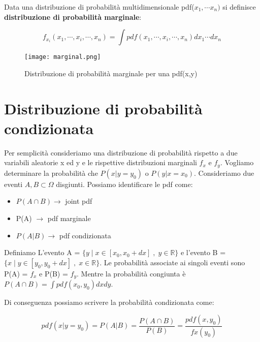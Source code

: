 Data una distribuzione di probabilit\`{a} multidimensionale pdf($x_1,\cdots x_n)$ si definisce \textbf{distribuzione di probabilit\`{a} marginale}:

\begin{equation}
	f_{x_i}(x_1, \cdots,x_{i},\cdots,x_n) = \int pdf(x_1,\cdots,x_i,\cdots,x_n)dx_1\cdots dx_n
\end{equation}

 
\begin{figure}[ht]
\vspace{0.in}
\texttt{[image: marginal.png]}	
\centering
\vspace{0.in}
\caption{Distribuzione di probabilit\`{a} marginale per una pdf(x,y)}
\end{figure}



\section{Distribuzione di probabilit\`{a} condizionata}

Per semplicit\`{a} consideriamo una distribuzione di probabilit\`{a} rispetto a due variabili aleatorie x ed y e le rispettive distribuzioni marginali $f_x$ e $f_y$. Vogliamo determinare la  probabilit\`{a} che $P(x \vert y = y_0)$ o $P(y \vert x = x_0) $. Consideriamo due eventi $A,B \subset \Omega$ disgiunti. Possiamo identificare le pdf come:

\begin{itemize}
	\item $P(A \cap B) \rightarrow $ joint pdf
	\item P(A) $\rightarrow$ pdf marginale
	\item $P(A|B) \rightarrow $ pdf condizionata
\end{itemize}

\noindent Definiamo L'evento A = $\{ y \; \vert \; x \in [x_0,x_0 +dx]\;,\; y \in \mathbb{R} \} $ e l'evento B = $\{ x \; \vert \; y \in [y_0,y_0 +dx]\;,\; x \in \mathbb{R} \} $. Le probabilit\`{a} associate ai singoli eventi sono P(A) = $f_x$ e P(B) = $f_y$. Mentre la probabilit\`{a} congiunta \`{e} $P(A \cap B) = \int pdf(x_0,y_0)dxdy$. 

Di conseguenza possiamo scrivere la probabilit\`{a} condizionata come:

\begin{equation}
	pdf(x \vert y = y_0) = P(A\vert B) = \dfrac{P(A \cap B)}{P(B)} = \dfrac{pdf(x,y_0)}{fx(y_0)}
\end{equation}

